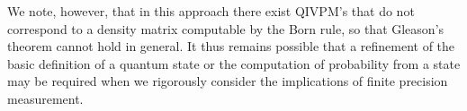 \documentclass[english,reprint, aps, prl,superscriptaddress, showpacs,
showkeys, longbibliography, amsmath, amssymb]{revtex4-1}
\theoremstyle{plain}
\theoremstyle{definition}
\begin{document}
We note, however, that in this approach there exist QIVPM's that do
not correspond to a density matrix computable by the Born rule, so
that Gleason's theorem cannot hold in general.  It thus remains
possible that a refinement of the basic definition of a quantum state
or the computation of probability from a state may be required when we
rigorously consider the implications of finite precision measurement.




\end{document}
